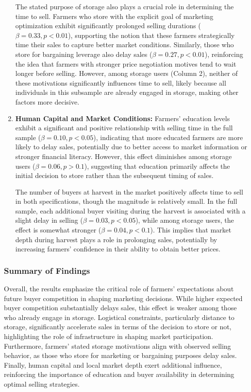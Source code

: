 \begin{enumerate}
    The stated purpose of storage also plays a crucial role in determining the time to sell. Farmers who store with the explicit goal of marketing optimization exhibit significantly prolonged selling durations (\(\beta = 0.33, p<0.01\)), supporting the notion that these farmers strategically time their sales to capture better market conditions. Similarly, those who store for bargaining leverage also delay sales (\(\beta = 0.27, p<0.01\)), reinforcing the idea that farmers with stronger price negotiation motives tend to wait longer before selling. However, among storage users (Column 2), neither of these motivations significantly influences time to sell, likely because all individuals in this subsample are already engaged in storage, making other factors more decisive.
    
    \item \textbf{Human Capital and Market Conditions:} Farmers’ education levels exhibit a significant and positive relationship with selling time in the full sample (\(\beta = 0.10, p<0.05\)), indicating that more educated farmers are more likely to delay sales, potentially due to better access to market information or stronger financial literacy. However, this effect diminishes among storage users (\(\beta = 0.06, p>0.1\)), suggesting that education primarily affects the initial decision to store rather than the subsequent timing of sales.
    
    The number of buyers at harvest in the market positively affects time to sell in both specifications, though the magnitude is relatively small. In the full sample, each additional buyer visiting during the harvest is associated with a slight delay in selling (\(\beta = 0.03, p<0.05\)), while among storage users, the effect is somewhat stronger (\(\beta = 0.04, p<0.1\)). This implies that market depth during harvest plays a role in prolonging sales, potentially by increasing farmers’ confidence in their ability to obtain better prices.
\end{enumerate}

\subsubsection{Summary of Findings}
\noindent 
Overall, the results emphasize the critical role of farmers’ expectations about future buyer competition in shaping marketing decisions. While higher expected buyer competition substantially delays sales, this effect is weaker among those who already engage in storage. Logistical constraints, particularly distance to storage, significantly accelerate sales in terms of the decision to store or not, highlighting the role of infrastructure in shaping market participation. Furthermore, farmers’ stated storage motivations align with observed selling behavior, as those who store for marketing or bargaining purposes delay sales. Finally, human capital and local market depth exert additional influence, reinforcing the importance of education and buyer availability in determining optimal selling strategies.



